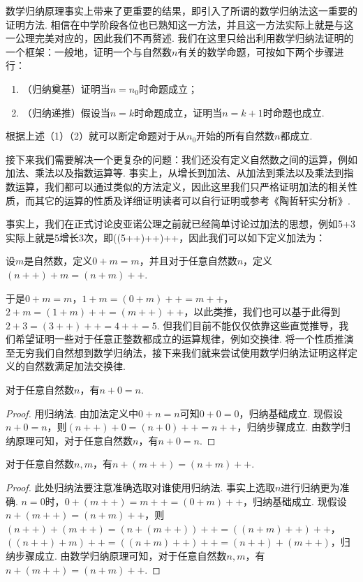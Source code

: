 数学归纳原理事实上带来了更重要的结果，即引入了所谓的数学归纳法这一重要的证明方法. 相信在中学阶段各位也已熟知这一方法，并且这一方法实际上就是与这一公理完美对应的，因此我们不再赘述. 我们在这里只给出利用数学归纳法证明的一个框架：一般地，证明一个与自然数$n$有关的数学命题，可按如下两个步骤进行：
\begin{enumerate}
    \item（归纳奠基）证明当$n=n_0$时命题成立；
    \item（归纳递推）假设当$n=k$时命题成立，证明当$n=k+1$时命题也成立.
\end{enumerate}
根据上述（1）（2）就可以断定命题对于从$n_0$开始的所有自然数$n$都成立.

接下来我们需要解决一个更复杂的问题：我们还没有定义自然数之间的运算，例如加法、乘法以及指数运算等. 事实上，从增长到加法、从加法到乘法以及乘法到指数运算，我们都可以通过类似的方法定义，因此这里我们只严格证明加法的相关性质，而其它的运算的性质及详细证明读者可以自行证明或参考《陶哲轩实分析》.

事实上，我们在正式讨论皮亚诺公理之前就已经简单讨论过加法的思想，例如5+3实际上就是5增长3次，即((5++)++)++，因此我们可以如下定义加法为：

\begin{definition*}
    设$m$是自然数，定义$0+m=m$，并且对于任意自然数$n$，定义$(n++)+m=(n+m)++$.
\end{definition*}

于是$0+m=m$，$1+m=(0+m)++=m++$，$2+m=(1+m)++=(m++)++$，以此类推，我们也可以基于此得到$2+3=(3++)++=4++=5$. 但我们目前不能仅仅依靠这些直觉推导，我们希望证明一些对于任意正整数都成立的运算规律，例如交换律. 将一个性质推演至无穷我们自然想到数学归纳法，接下来我们就来尝试使用数学归纳法证明这样定义的自然数满足加法交换律.

\begin{lemma*}
    对于任意自然数$n$，有$n+0=n$.
\end{lemma*}
\begin{proof}
    用归纳法. 由加法定义中$0+n=n$可知$0+0=0$，归纳基础成立. 现假设$n+0=n$，则$(n++)+0=(n+0)++=n++$，归纳步骤成立. 由数学归纳原理可知，对于任意自然数$n$，有$n+0=n$.
\end{proof}

\begin{lemma*}
    对于任意自然数$n,m$，有$n+(m++)=(n+m)++$.
\end{lemma*}
\begin{proof}
    此处归纳法要注意准确选取对谁使用归纳法. 事实上选取$n$进行归纳更为准确. $n=0$时，$0+(m++)=m++=(0+m)++$，归纳基础成立. 现假设$n+(m++)=(n+m)++$，则$(n++)+(m++)=(n+(m++))++=((n+m)++)++$，$((n++)+m)++=((n+m)++)++=(n++)+(m++)$，归纳步骤成立. 由数学归纳原理可知，对于任意自然数$n,m$，有$n+(m++)=(n+m)++$.
\end{proof}

